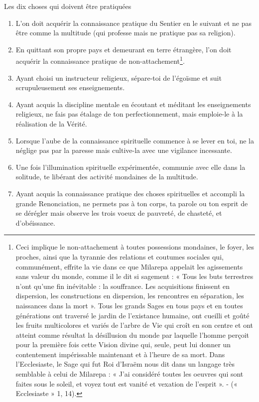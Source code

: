\documentclass[10pt]{book}
\makeatletter
\renewcommand{\section}{\@startsection{section}{0}{0mm}
   {\baselineskip}
   {\baselineskip}{\normalfont\normalsize\scshape\centering}
}
\makeatother
\begin{document}
\section{Les dix choses qui doivent être pratiquées}
\begin{enumerate}[1.-]
\item L'on doit acquérir la connaissance pratique du Sentier en le suivant et ne pas être comme la multitude (qui professe mais ne pratique pas sa religion).
\item En quittant son propre pays et demeurant en terre étrangère, l'on doit acquérir la connaissance pratique de non-attachement\footnote{Ceci implique le non-attachement à toutes possessions mondaines, le foyer, les proches, ainsi que la tyrannie des relations et coutumes sociales qui, communément, effrite la vie dans ce que Milarepa appelait les agissements sans valeur du monde, comme il le dit si sagement : « Tous les buts terrestres n'ont qu'une fin inévitable : la souffrance. Les acquisitions finissent en dispersion, les constructions en dispersion, les rencontres en séparation, les naissances dans la mort ». Tous les grands Sages en tous pays et en toutes générations ont traversé le jardin de l'existance humaine, ont cueilli et goûté les fruits multicolores et variés de l'arbre de Vie qui croît en son centre et ont atteint comme résultat la désillusion du monde par laquelle l'homme perçoit pour la première fois cette Vision divine qui, seule, peut lui donner un contentement impérissable maintenant et à l'heure de sa mort. Dans l'Ecclesiaste, le Sage qui fut Roi d'Israëm nous dit dans un langage très semblable à celui de Milarepa : « J'ai considéré toutes les oeuvres qui sont faites sous le soleil, et voyez tout est vanité et vexation de l'esprit ». - (« Ecclesiaste » 1, 14).}.
\item Ayant choisi un instructeur religieux, sépare-toi de l'égoïsme et suit scrupuleusement ses enseignements.
\item Ayant acquis la discipline mentale en écoutant et méditant les enseignements religieux, ne fais pas étalage de ton perfectionnement, mais emploie-le à la réalisation de la Vérité.
\item Lorsque l'aube de la connaissance spirituelle commence à se lever en toi, ne la néglige pas par la paresse mais cultive-la avec une vigilance incessante.
\item Une fois l'illumination spirituelle expérimentée, communie avec elle dans la solitude, te libérant des activité mondaines de la multitude.
\item Ayant acquis la connaissance pratique des choses spirituelles et accompli la grande Renonciation, ne permets pas à ton corps, ta parole ou ton esprit de se dérégler mais observe les trois voeux de pauvreté, de chasteté, et d'obéissance.

\end{enumerate}
\end{document}
